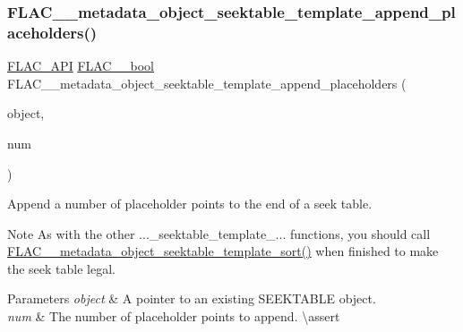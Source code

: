 \subsubsection{\texorpdfstring{FLAC\_\_metadata\_object\_seektable\_template\_append\_placeholders()}{FLAC\_\_metadata\_object\_seektable\_template\_append\_placeholders()}}
{\footnotesize\ttfamily \mbox{\hyperlink{group__flac__export_ga56ca07df8a23310707732b1c0007d6f5}{F\+L\+A\+C\+\_\+\+A\+PI}} \mbox{\hyperlink{ordinals_8h_a95103469f1cbd78b8cf250194985b34e}{F\+L\+A\+C\+\_\+\+\_\+bool}} F\+L\+A\+C\+\_\+\+\_\+metadata\+\_\+object\+\_\+seektable\+\_\+template\+\_\+append\+\_\+placeholders (\begin{DoxyParamCaption}\item[{\mbox{\hyperlink{struct_f_l_a_c_____stream_metadata}{F\+L\+A\+C\+\_\+\+\_\+\+Stream\+Metadata}} $\ast$}]{object,  }\item[{unsigned}]{num }\end{DoxyParamCaption})}

Append a number of placeholder points to the end of a seek table.

\begin{DoxyNote}{Note}
As with the other ...\+\_\+seektable\+\_\+template\+\_\+... functions, you should call \mbox{\hyperlink{group__flac__metadata__object_gaee6a1f08321b56a3fa65af94dd7830cd}{F\+L\+A\+C\+\_\+\+\_\+metadata\+\_\+object\+\_\+seektable\+\_\+template\+\_\+sort()}} when finished to make the seek table legal.
\end{DoxyNote}

\begin{DoxyParams}{Parameters}
{\em object} & A pointer to an existing S\+E\+E\+K\+T\+A\+B\+LE object. \\
\hline
{\em num} & The number of placeholder points to append. \textbackslash{}assert 
\begin{DoxyCode}{1}
\end{DoxyCode}
 
\begin{DoxyCode}{1}
\end{DoxyCode}
 \\
\hline
\end{DoxyParams}


